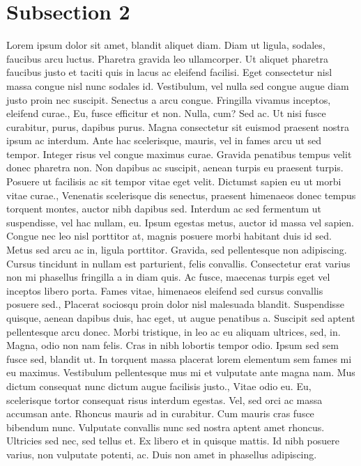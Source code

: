 \documentclass{source/tex/templates/maththesis}
\begin{document}
\hypertarget{subsection-2-1}{%
\section{Subsection 2}\label{subsection-2-1}}

Lorem ipsum dolor sit amet, blandit aliquet diam. Diam ut ligula, sodales, faucibus arcu luctus. Pharetra gravida leo ullamcorper. Ut aliquet pharetra faucibus justo et taciti quis in lacus ac eleifend facilisi. Eget consectetur nisl massa congue nisl nunc sodales id. Vestibulum, vel nulla sed congue augue diam justo proin nec suscipit. Senectus a arcu congue. Fringilla vivamus inceptos, eleifend curae., Eu, fusce efficitur et non. Nulla, cum? Sed ac. Ut nisi fusce curabitur, purus, dapibus purus. Magna consectetur sit euismod praesent nostra ipsum ac interdum. Ante hac scelerisque, mauris, vel in fames arcu ut sed tempor. Integer risus vel congue maximus curae. Gravida penatibus tempus velit donec pharetra non. Non dapibus ac suscipit, aenean turpis eu praesent turpis. Posuere ut facilisis ac sit tempor vitae eget velit. Dictumst sapien eu ut morbi vitae curae., Venenatis scelerisque dis senectus, praesent himenaeos donec tempus torquent montes, auctor nibh dapibus sed. Interdum ac sed fermentum ut suspendisse, vel hac nullam, eu. Ipsum egestas metus, auctor id massa vel sapien. Congue nec leo nisl porttitor at, magnis posuere morbi habitant duis id sed. Metus sed arcu ac in, ligula porttitor. Gravida, sed pellentesque non adipiscing. Cursus tincidunt in nullam est parturient, felis convallis. Consectetur erat varius non mi phasellus fringilla a in diam quis. Ac fusce, maecenas turpis eget vel inceptos libero porta. Fames vitae, himenaeos eleifend sed cursus convallis posuere sed., Placerat sociosqu proin dolor nisl malesuada blandit. Suspendisse quisque, aenean dapibus duis, hac eget, ut augue penatibus a. Suscipit sed aptent pellentesque arcu donec. Morbi tristique, in leo ac eu aliquam ultrices, sed, in. Magna, odio non nam felis. Cras in nibh lobortis tempor odio. Ipsum sed sem fusce sed, blandit ut. In torquent massa placerat lorem elementum sem fames mi eu maximus. Vestibulum pellentesque mus mi et vulputate ante magna nam. Mus dictum consequat nunc dictum augue facilisis justo., Vitae odio eu. Eu, scelerisque tortor consequat risus interdum egestas. Vel, sed orci ac massa accumsan ante. Rhoncus mauris ad in curabitur. Cum mauris cras fusce bibendum nunc. Vulputate convallis nunc sed nostra aptent amet rhoncus. Ultricies sed nec, sed tellus et. Ex libero et in quisque mattis. Id nibh posuere varius, non vulputate potenti, ac. Duis non amet in phasellus adipiscing.
\end{document}
